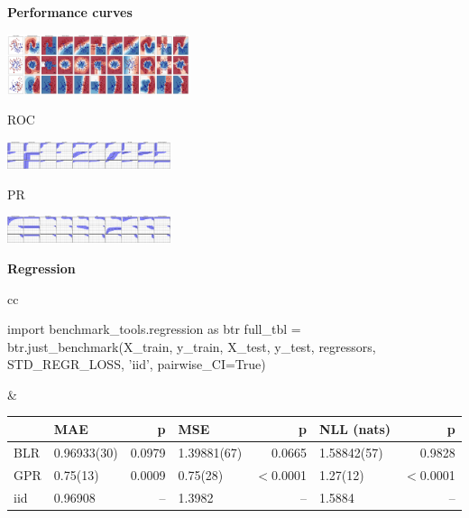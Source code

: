 \documentclass[a0,landscape]{a0poster}
\newcommand{\sectionx}{\textbf}
\begin{document}
\begin{multicols}{2}
\columnbreak

\sectionx{Performance curves}

\includegraphics[width=0.4\textwidth]{output.png}\\
\begin{minipage}[b][2.7in][c]{1.6in}
ROC
\end{minipage}
\includegraphics[width=0.36\textwidth]{AUC.png}\\
\begin{minipage}[b][2.7in][c]{1.6in}
PR
\end{minipage}
\includegraphics[width=0.36\textwidth]{AP.png}

\sectionx{Regression}

\vspace{-1cm}

{\normalsize
\begin{tabular}{cc}
\begin{pycode}
import benchmark_tools.regression as btr
full_tbl = btr.just_benchmark(X_train, y_train, X_test, y_test,
                              regressors, STD_REGR_LOSS, 'iid',
                              pairwise_CI=True)
\end{pycode}
&
{\footnotesize
\begin{tabular}{|l|l|r|l|r|l|r|}
\toprule
{}  &        {MAE} &     {p} &        {MSE} &      {p} & {NLL (nats)} &      {p} \\
\midrule
BLR &  0.96933(30) &  0.0979 &  1.39881(67) &   0.0665 &  1.58842(57) &   0.9828 \\
GPR &  0.75(13)    &  0.0009 &  0.75(28)    &  $<$0.0001 &  1.27(12)    &  $<$0.0001 \\
iid &  0.96908     &    {--} &  1.3982      &     {--} &  1.5884      &     {--} \\
\bottomrule
\end{tabular}
}
\end{tabular}
}

\end{multicols}
\end{document}
